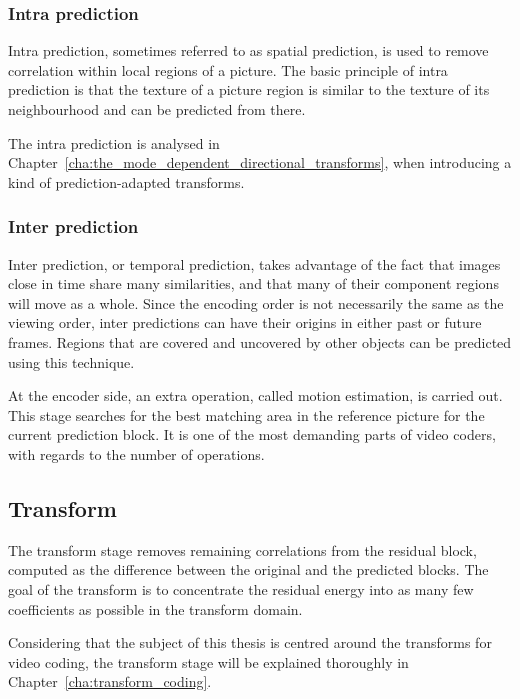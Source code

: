 \documentclass[11pt,a4paper,openright,twoside]{book}
\numberwithin{equation}{section} %
\numberwithin{figure}{section} %
\numberwithin{table}{section} %
\begin{document}
\subsubsection{Intra prediction}
\label{ssub:intra_prediction}

Intra prediction, sometimes referred to as spatial prediction, is used
to remove correlation within local regions of a picture.
The basic principle of intra prediction is that the texture of a picture
region is similar to the texture of its neighbourhood and can be
predicted from there.

The intra prediction is analysed in
Chapter~\ref{cha:the_mode_dependent_directional_transforms}, when
introducing a kind of prediction-adapted transforms.

\subsubsection{Inter prediction}
\label{ssub:inter_prediction}

Inter prediction, or temporal prediction, takes advantage of the fact
that images close in time share many similarities, and that many of
their component regions will move as a whole.
Since the encoding order is not necessarily the same as the viewing
order, inter predictions can have their origins in either past or future
frames.
Regions that are covered and uncovered by other objects can be predicted
using this technique.

At the encoder side, an extra operation, called motion estimation, is
carried out.
This stage searches for the best matching area in the reference picture
for the current prediction block.
It is one of the most demanding parts of video coders, with regards to
the number of operations.

\subsection{Transform}
\label{sub:transform}

The transform stage removes remaining correlations from the residual
block, computed as the difference between the original and the predicted
blocks.
The goal of the transform is to concentrate the residual energy into as
many few coefficients as possible in the transform domain.

Considering that the subject of this thesis is centred around the
transforms for video coding, the transform stage will be explained
thoroughly in Chapter~\ref{cha:transform_coding}.
\end{document}
